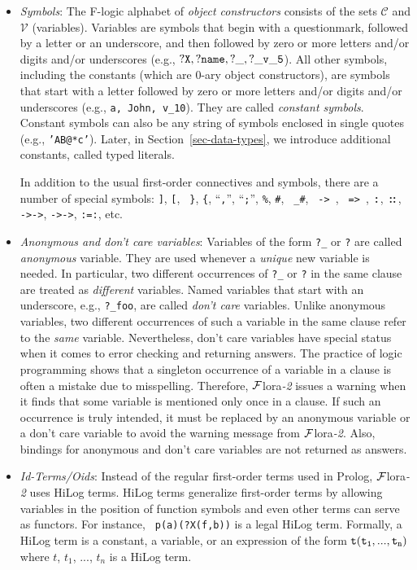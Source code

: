 \documentclass[11pt]{article}
\newcommand{\isa}{\,{\bf{:}}\,}
\newcommand{\subcl}{\,{\bf{::}}\,}
\newcommand{\mvd}{{\mbox{\tt \,->\,}}}  %
\newcommand{\Mvd}{{\mbox{\tt \,=>\,}}}  %
\newcommand{\FLORA}{{\mbox{\sc ${\cal F}${lora}\rm\emph{-2}}}\xspace}
\newcommand{\fl}{\mbox{F-logic}\xspace}
\newcommand{\consts}{\ensuremath{\mathcal{C}}\xspace}
\newcommand{\vars}{\ensuremath{\mathcal{V}}\xspace}
\begin{document}
\begin{itemize}
\item \emph{Symbols}: The \fl alphabet of \emph{object constructors}
  consists of the sets \consts
  and \vars
  (variables).  Variables are symbols that begin with a questionmark,
  followed by a letter or an underscore, and then followed by zero or more letters and/or digits and/or
  underscores (e.g., $\tt ?X, ?name, ?\_, ?\_v\_5$).  All other symbols,
  including the constants (which are 0-ary object constructors), are
  symbols that start with a letter followed by zero or more letters and/or digits and/or
  underscores (e.g., {\tt a, John, v\_10}). They are called \emph{constant
  symbols}.  
  Constant symbols can also be any string of symbols enclosed in single quotes
  (e.g., {\tt 'AB@*c'}).
  Later, in Section~\ref{sec-data-types}, we introduce additional constants,
  called typed literals.
  
  In addition to the usual first-order connectives
  and symbols, there are a number of special symbols: {\tt ]}, {\tt [}, {\tt
    \}}, {\tt \{}, ``{\tt ,}'', ``{\tt ;}'', {\tt \%}, {\tt \#}, {\tt
    \_\#}, \mvd,
  \Mvd, \isa, \subcl, {\tt ->->}, {\tt *->->}, {\tt :=:}, etc.
  
\item \emph{Anonymous and don't care variables}: Variables  of the form
  {\tt ?\_} or {\tt ?} are called \emph{anonymous}
  variable. They are used whenever a \emph{unique} new variable is needed.  In
  particular, two different occurrences of {\tt ?\_} or {\tt ?} in the same clause are
  treated as \emph{different} variables. Named variables that start with an
  underscore, e.g., {\tt ?\_foo}, are called \emph{don't care} variables.
  Unlike anonymous variables, two different occurrences of such a variable
  in the same clause refer to the \emph{same} variable. Nevertheless, don't
  care variables have special status when it comes to error checking
  and returning answers.  The practice of logic programming shows that a
  singleton occurrence of a variable in a clause is often a mistake due to
  misspelling. Therefore, \FLORA issues a warning when it finds that some
  variable is mentioned only once in a clause. If such an occurrence is
  truly intended, it must be replaced by an anonymous variable or a don't
  care variable to avoid the warning message from \FLORA. Also, bindings
  for anonymous and don't care variables are not returned as answers.

\item \emph{Id-Terms/Oids}:
  Instead of the regular first-order terms used in Prolog, \FLORA
  uses HiLog terms. HiLog terms \cite{hilog-jlp} generalize first-order
  terms by allowing variables in the position of function symbols
  and even other terms can serve as functors. For instance, {\tt
  p(a)(?X(f,b))} is a legal HiLog term. Formally, a HiLog term is a
  constant, a variable, or an expression of the form $\tt t(t_1,...,t_n)$ 
  where $t$, $t_1$, ..., $t_n$ is a HiLog term.


\end{itemize}
\end{document}
